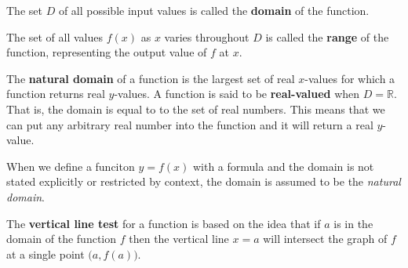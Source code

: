   The set \(D\) of all possible input values is called the \textbf{domain} of the function.

  The set of all values \(f(x)\) as \(x\) varies throughout \(D\) is called the \textbf{range} of the function, representing the output value of \(f\) at \(x\).

   The \textbf{natural domain} of a function is the largest set of real \(x\)-values for which a function returns real \(y\)-values.
  A function is said to be \textbf{real-valued} when \(D = \mathbb{R}\).
  That is, the domain is equal to to the set of real numbers.
  This means that we can put any arbitrary real number into the function and it will return a real $y$-value.

   \begin{remark}
     When we define a funciton \(y=f(x)\) with a formula and the domain is not stated explicitly or restricted by context, the domain is assumed to be the \emph{natural domain}.
   \end{remark}

  The \textbf{vertical line test} for a function is based on the idea that if \(a\) is in the domain of the function \(f\) then the vertical line \(x=a\) will intersect the graph of \(f\) at a single point \( \big(a,f(a)\big)\).

\begin{figure}[H]
  \begin{center}
  \end{center}
\end{figure}


